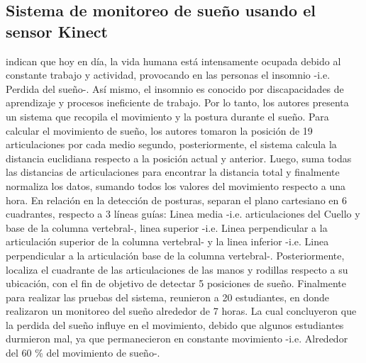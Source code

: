 \subsection{Sistema de monitoreo de sue\~no usando el sensor Kinect} \label{tr:5}
 indican que hoy en d\'ia, la vida humana est\'a intensamente ocupada debido al constante trabajo y actividad, provocando en las personas el insomnio -i.e. Perdida del sue\~no-. As\'i mismo, el insomnio es conocido por discapacidades de aprendizaje y procesos ineficiente de trabajo. Por lo tanto, los autores presenta un sistema que recopila el movimiento y la postura durante el sue\~no.
\medbreak
Para calcular el movimiento de sue\~no, los autores tomaron la posici\'on de 19 articulaciones por cada medio segundo, posteriormente, el sistema calcula la distancia euclidiana respecto a la posici\'on actual y anterior. Luego, suma todas las distancias de articulaciones para encontrar la distancia total y finalmente normaliza los datos, sumando todos los valores del movimiento respecto a una hora.
\medbreak
En relaci\'on en la detecci\'on de posturas,  separan el plano cartesiano en 6 cuadrantes, respecto a 3 l\'ineas gu\'ias: Linea media -i.e. articulaciones del Cuello y base de la columna vertebral-, linea superior -i.e. Linea perpendicular a la articulaci\'on superior  de la columna vertebral- y la linea inferior -i.e. Linea perpendicular a la articulaci\'on base  de la columna vertebral-. Posteriormente, localiza el cuadrante de las articulaciones de las manos y rodillas respecto a su ubicaci\'on, con el fin de objetivo de detectar 5 posiciones de sue\~no.
\medbreak
Finalmente para realizar las pruebas del sistema, reunieron a 20 estudiantes, en donde realizaron un monitoreo del sue\~no alrededor de 7 horas. La cual concluyeron que la perdida del sue\~no influye en el movimiento, debido que algunos estudiantes durmieron mal, ya que permanecieron en constante movimiento -i.e. Alrededor del 60 \% del  movimiento de sue\~no-.
